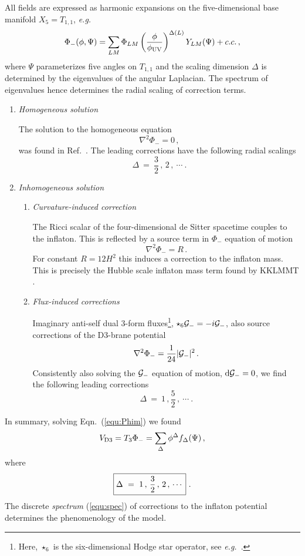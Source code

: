 \documentclass[12pt,letterpaper,rotate]{article}
\def\beq{\begin{equation}}
\def\eeq{\end{equation}}
\def\d{{\rm d}}
\begin{document}
{All fields are expressed as harmonic expansions on the five-dimensional base manifold $X_5 = T_{1,1}$, {\it e.g.}
\beq
\Phi_-(\phi, \Psi) = \sum_{LM} \Phi_{LM} \left( \frac{\phi}{\phi_{\rm UV}} \right)^{\Delta(L)} Y_{LM}(\Psi) + c.c.\, ,
\eeq
where $\Psi$ parameterizes five angles on $T_{1,1}$ and the scaling dimension $\Delta$ is determined by the eigenvalues of the angular Laplacian.
The spectrum of eigenvalues hence determines the radial scaling of correction terms.

\begin{enumerate}
\item {\it Homogeneous solution}

The solution to the homogeneous equation
\beq
\nabla^2 \Phi_- = 0\, ,
\eeq
was found in Ref.~\cite{Baumann:2008kq}. The leading corrections have the following radial scalings
\beq
\Delta \ = \ \frac{3}{2}\, , \, 2 \, ,  \ \cdots \ .
\eeq

\item {\it Inhomogeneous solution}
\begin{enumerate}
\item {\it Curvature-induced correction}

The Ricci scalar of the four-dimensional de Sitter spacetime couples to the inflaton.
This is reflected by a source term in $\Phi_-$ equation of motion
\beq
\nabla^2 \Phi_- =  R\, .
\eeq
For constant $R = 12 H^2$ this induces a correction to the inflaton mass.
This is precisely the Hubble scale inflaton mass term found by KKLMMT \cite{KKLMMT}.

\item {\it Flux-induced corrections}

Imaginary anti-self dual 3-form fluxes\footnote{Here, $\star_6$ is the six-dimensional Hodge star operator, see {\it e.g.}~\cite{Nakahara}.}, $\star_6 {\cal G}_- = - i {\cal G}_-$, also source corrections of the D3-brane potential~\cite{BaumannProgress}
\beq
\nabla^2 \Phi_- = \frac{1}{24} |{\cal G}_-|^2 \, .
\eeq
Consistently also solving the ${\cal G}_-$ equation of motion, $\d {\cal G}_-= 0$, we find the following leading corrections
\beq
\Delta \ = \ 1\, , \frac{5}{2} \, ,  \ \cdots \ .
\eeq
\end{enumerate}
\end{enumerate}

In summary, solving Eqn.~(\ref{equ:Phim}) 
we found~\cite{Baumann:2008kq}
\beq
V_{\rm D3} = T_3 \Phi_- = \sum_\Delta \phi^\Delta f_\Delta(\Psi)\, ,
\eeq
where
\beq
\label{equ:spec}
\fbox{$\displaystyle
\Delta \ = \ 1\, , \, \frac{3}{2} \, , \, 2 \, , \, \cdots $} \ .
\eeq
The discrete {\it spectrum} (\ref{equ:spec}) of corrections to the inflaton potential determines the phenomenology of the model.

}
\end{document}
